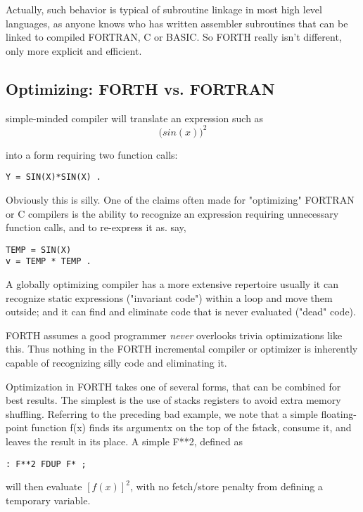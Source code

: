 Actually, such behavior is typical of subroutine linkage in most high
level languages, as anyone knows who has written assembler subroutines that can
be linked to compiled FORTRAN, C or BASIC.
So FORTH really isn't different, only more explicit and efficient.

\subsection{Optimizing: FORTH vs. FORTRAN}
 simple-minded compiler will translate an expression such as
\begin{equation}
     \Big( sin(x) \Big)^2\nonumber
\end{equation}

into a form requiring two function calls:

\begin{verbatim}
Y = SIN(X)*SIN(X) .
\end{verbatim}

Obviously this is silly. One of the claims often made for "optimizing" FORTRAN
or C compilers is the ability to recognize an
expression requiring unnecessary function calls, and to re-express
it as. say,
  
\begin{verbatim}
TEMP = SIN(X)
v = TEMP * TEMP .
\end{verbatim}

A globally optimizing compiler has a more extensive repertoire
usually it can recognize static expressions ("invariant code")
within a loop and move them outside; and it can find and eliminate code that is
never evaluated ("dead" code).

FORTH assumes a good programmer \textit{never} overlooks trivia
optimizations like this. Thus nothing in the FORTH incremental
compiler or optimizer is inherently capable of recognizing silly
code and eliminating it.

Optimization in FORTH takes one of several forms, that can be
combined for best results. The simplest is the use of stacks
registers to avoid extra memory shuffling. Referring to the
preceding bad example, we note that a simple floating-point
function f(x) finds its argumentx on the top of the fstack, consume
it, and leaves the result in its place. A simple F**2, defined as

\begin{verbatim}
: F**2 FDUP F* ;
\end{verbatim}

will then evaluate $[f(x)]^2$, with no fetch/store penalty from defining
a temporary variable.

